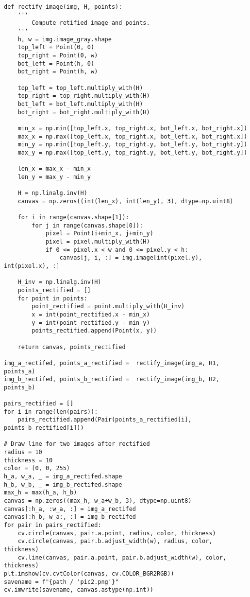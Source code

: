 \documentclass[11pt]{article}
\begin{document}
\begin{lstlisting}
def rectify_image(img, H, points):
    '''
        Compute retified image and points.
    '''
    h, w = img.image_gray.shape
    top_left = Point(0, 0)
    top_right = Point(0, w)
    bot_left = Point(h, 0)
    bot_right = Point(h, w)

    top_left = top_left.multiply_with(H)
    top_right = top_right.multiply_with(H)
    bot_left = bot_left.multiply_with(H)
    bot_right = bot_right.multiply_with(H)

    min_x = np.min([top_left.x, top_right.x, bot_left.x, bot_right.x])
    max_x = np.max([top_left.x, top_right.x, bot_left.x, bot_right.x])
    min_y = np.min([top_left.y, top_right.y, bot_left.y, bot_right.y])
    max_y = np.max([top_left.y, top_right.y, bot_left.y, bot_right.y])

    len_x = max_x - min_x
    len_y = max_y - min_y
    
    H = np.linalg.inv(H)
    canvas = np.zeros((int(len_x), int(len_y), 3), dtype=np.uint8)

    for i in range(canvas.shape[1]):
        for j in range(canvas.shape[0]):
            pixel = Point(i+min_x, j+min_y)
            pixel = pixel.multiply_with(H)
            if 0 <= pixel.x < w and 0 <= pixel.y < h:
                canvas[j, i, :] = img.image[int(pixel.y), int(pixel.x), :]

    H_inv = np.linalg.inv(H)
    points_rectified = []
    for point in points:
        point_rectified = point.multiply_with(H_inv)
        x = int(point_rectified.x - min_x)
        y = int(point_rectified.y - min_y)
        points_rectified.append(Point(x, y))
    
    return canvas, points_rectified

img_a_rectifed, points_a_rectified =  rectify_image(img_a, H1, points_a)
img_b_rectifed, points_b_rectified =  rectify_image(img_b, H2, points_b)

pairs_rectified = []
for i in range(len(pairs)):
    pairs_rectified.append(Pair(points_a_rectified[i], points_b_rectified[i]))

# Draw line for two images after rectified
radius = 10
thickness = 10
color = (0, 0, 255)
h_a, w_a, _ = img_a_rectifed.shape
h_b, w_b, _ = img_b_rectifed.shape
max_h = max(h_a, h_b)
canvas = np.zeros((max_h, w_a+w_b, 3), dtype=np.uint8)
canvas[:h_a, :w_a, :] = img_a_rectifed
canvas[:h_b, w_a:, :] = img_b_rectifed
for pair in pairs_rectified:
    cv.circle(canvas, pair.a.point, radius, color, thickness)
    cv.circle(canvas, pair.b.adjust_width(w), radius, color, thickness)
    cv.line(canvas, pair.a.point, pair.b.adjust_width(w), color, thickness)
plt.imshow(cv.cvtColor(canvas, cv.COLOR_BGR2RGB))
savename = f"{path / 'pic2.png'}"
cv.imwrite(savename, canvas.astype(np.int))


\end{lstlisting}
\end{document}

